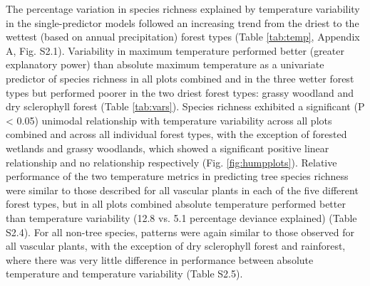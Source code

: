 The percentage variation in species richness explained by temperature variability in the single-predictor models followed an increasing trend from the driest to the wettest (based on annual precipitation) forest types (Table \ref{tab:temp}, Appendix A, Fig. S2.1). Variability in maximum temperature performed better (greater explanatory power) than absolute maximum temperature as a univariate predictor of species richness in all plots combined and in the three wetter forest types but performed poorer in the two driest forest types: grassy woodland and dry sclerophyll forest (Table \ref{tab:vars}). Species richness exhibited a significant (P {\textless} 0.05) unimodal relationship with temperature variability across all plots combined and across all individual forest types, with the exception of forested wetlands and grassy woodlands, which showed a significant positive linear relationship and no relationship respectively (Fig. \ref{fig:humpplots}). Relative performance of the two temperature metrics in predicting tree species richness were similar to those described for all vascular plants in each of the five different forest types, but in all plots combined absolute temperature performed better than temperature variability (12.8 vs. 5.1 percentage deviance explained) (Table S2.4). For all non-tree species, patterns were again similar to those observed for all vascular plants, with the exception of dry sclerophyll forest and rainforest, where there was very little difference in performance between absolute temperature and temperature variability (Table S2.5).

